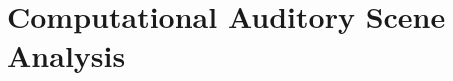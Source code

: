 \documentclass[a4paper,10pt,final]{ThesisStyle}
\begin{document}










\chapter{Computational Auditory Scene Analysis}
\label{ch:analysis-audio}
\minitoc

\end{document}

